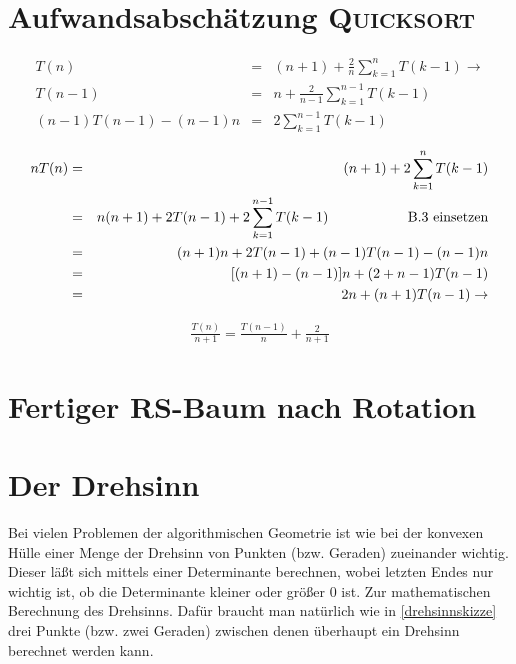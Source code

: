 \documentclass[ngerman,draft,parskip=half*,twoside]{scrreprt}
\theoremstyle{break}
\theoremstyle{nonumberbreak}
\begin{document}
\section{Aufwandsabschätzung \textsc{Quicksort}}
\label{quicksort}

\begin{align}
T(n) & = & (n+1)+ \frac{2}{n} \sum_{k=1}^nT(k-1) \rightarrow\\
T(n-1) & = & n+\frac{2}{n-1} \sum_{k=1}^{n-1}T(k-1)\\
(n-1)T(n-1) - (n-1)n & = & 2\sum_{k=1}^{n-1}T(k-1)
\end{align}

\begin{align*}
n T(n) & = & (n+1)+ 2 \sum_{k=1}^nT(k-1)\\
& = & n(n+1)+2 T(n-1) +2 \sum_{k=1}^{n-1}T(k-1) \hspace{2cm} \textup{B.3 einsetzen}\\
& = & (n+1)n+2 T(n-1) + (n-1)T(n-1) -(n-1)n\\
& = & [(n+1)-(n-1)]n+(2+n-1) T(n-1)\\
& = & 2n+(n+1)T(n-1) \rightarrow 
\end{align*}

\begin{gather*}
\frac{T(n)}{n+1}= \frac{T(n-1)}{n}+ \frac{2}{n+1}	
\end{gather*}

\section{Fertiger RS-Baum nach Rotation}
\label{rsrotation}
\begin{figure}[H]
\centering


\end{figure}

\section{Der Drehsinn} \label{drehsinn}
Bei vielen Problemen der algorithmischen Geometrie ist wie bei der konvexen Hülle einer Menge der Drehsinn von Punkten (bzw. Geraden) zueinander wichtig.
Dieser läßt sich mittels einer Determinante berechnen, wobei letzten Endes nur wichtig ist, ob die Determinante kleiner oder größer
0 ist. Zur
mathematischen Berechnung des Drehsinns. Dafür braucht man natürlich wie in
\autoref{drehsinnskizze} drei Punkte (bzw. zwei Geraden) zwischen denen überhaupt ein Drehsinn berechnet werden kann.
\end{document}
